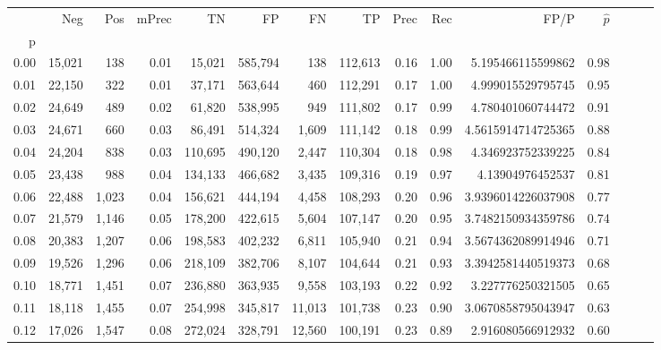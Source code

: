 \begin{tabular}{rrrrrrrrrrrrrrr}
\toprule
{} &     Neg &    Pos & mPrec &       TN &       FP &       FN &       TP &  Prec &   Rec &                  FP/P & $\hat{p}$ \\
p    &         &        &       &          &          &          &          &       &       &                       &           \\
\midrule
0.00 &  15,021 &    138 &  0.01 &   15,021 &  585,794 &      138 &  112,613 &  0.16 &  1.00 &     5.195466115599862 &      0.98 \\
0.01 &  22,150 &    322 &  0.01 &   37,171 &  563,644 &      460 &  112,291 &  0.17 &  1.00 &     4.999015529795745 &      0.95 \\
0.02 &  24,649 &    489 &  0.02 &   61,820 &  538,995 &      949 &  111,802 &  0.17 &  0.99 &     4.780401060744472 &      0.91 \\
0.03 &  24,671 &    660 &  0.03 &   86,491 &  514,324 &    1,609 &  111,142 &  0.18 &  0.99 &    4.5615914714725365 &      0.88 \\
0.04 &  24,204 &    838 &  0.03 &  110,695 &  490,120 &    2,447 &  110,304 &  0.18 &  0.98 &     4.346923752339225 &      0.84 \\
0.05 &  23,438 &    988 &  0.04 &  134,133 &  466,682 &    3,435 &  109,316 &  0.19 &  0.97 &      4.13904976452537 &      0.81 \\
0.06 &  22,488 &  1,023 &  0.04 &  156,621 &  444,194 &    4,458 &  108,293 &  0.20 &  0.96 &    3.9396014226037908 &      0.77 \\
0.07 &  21,579 &  1,146 &  0.05 &  178,200 &  422,615 &    5,604 &  107,147 &  0.20 &  0.95 &    3.7482150934359786 &      0.74 \\
0.08 &  20,383 &  1,207 &  0.06 &  198,583 &  402,232 &    6,811 &  105,940 &  0.21 &  0.94 &    3.5674362089914946 &      0.71 \\
0.09 &  19,526 &  1,296 &  0.06 &  218,109 &  382,706 &    8,107 &  104,644 &  0.21 &  0.93 &    3.3942581440519373 &      0.68 \\
0.10 &  18,771 &  1,451 &  0.07 &  236,880 &  363,935 &    9,558 &  103,193 &  0.22 &  0.92 &     3.227776250321505 &      0.65 \\
0.11 &  18,118 &  1,455 &  0.07 &  254,998 &  345,817 &   11,013 &  101,738 &  0.23 &  0.90 &    3.0670858795043947 &      0.63 \\
0.12 &  17,026 &  1,547 &  0.08 &  272,024 &  328,791 &   12,560 &  100,191 &  0.23 &  0.89 &     2.916080566912932 &      0.60 \\

\end{tabular}
